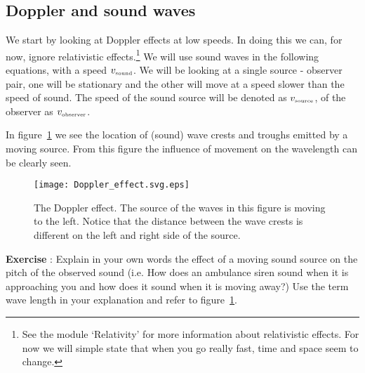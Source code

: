 \subsection{Doppler and sound waves}
We start by looking at Doppler effects at low speeds. In doing this we can, for now, ignore relativistic effects.\footnote{See the module `Relativity' for more information about relativistic effects. For now we will simple state that when you go really fast, time and space seem to change.} We will use sound waves in the following equations, with a speed $v_{\mbox{\begin{tiny}sound\end{tiny}}}$. We will be looking at a single source - observer pair, one will be stationary and the other will move at a speed slower than the speed of sound. The speed of the sound source will be denoted as $v_{\mbox{\begin{tiny}source\end{tiny}}}$, of the observer as $v_{\mbox{\begin{tiny}observer\end{tiny}}}$. 

In figure~\ref{fig:doppler_1} we see the location of (sound) wave crests and troughs emitted by a moving source. From this figure the influence of movement on the wavelength can be clearly seen.
\begin{figure}[t]\begin{center}
\texttt{[image: Doppler\_effect.svg.eps]}%
\caption{The Doppler effect. The source of the waves in this figure is moving to the left. Notice that the distance between the wave crests is different on the left and right side of the source.}\label{fig:doppler_1}
\end{center}\end{figure}

\begin{shaded}
\textbf{Exercise \theExercise {}} : Explain in your own words the effect of a moving sound source on the pitch of the observed sound (i.e. How does an ambulance siren sound when it is approaching you and how does it sound when it is moving away?) Use the term wave length in your explanation and refer to figure~\ref{fig:doppler_1}.\end{shaded}

